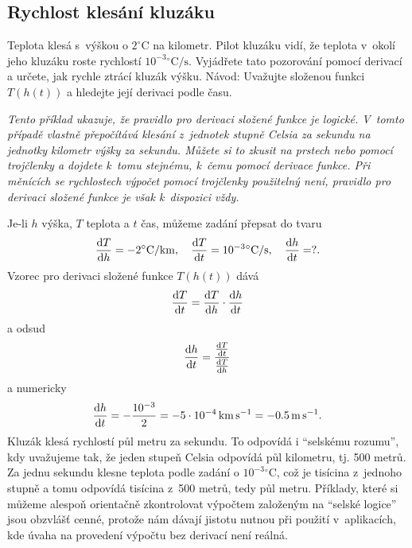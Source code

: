 \konec


\stranka


\subsection{Rychlost klesání kluzáku}
Teplota klesá s výškou o $2^\circ \mathrm C$ na kilometr. Pilot
kluzáku vidí, že teplota v okolí jeho kluzáku roste rychlostí
$10^{-3}{}^\circ \mathrm C/\mathrm{s}$. Vyjádřete tato pozorování pomocí
derivací a určete, jak rychle ztrácí kluzák výšku. Návod: Uvažujte složenou funkci $T(h(t))$ a hledejte její derivaci podle času.

\textit{Tento příklad ukazuje, že pravidlo pro derivaci složené funkce je logické. V tomto případě vlastně přepočítává klesání z jednotek stupně Celsia za sekundu na jednotky kilometr výšky za sekundu. Můžete si to zkusit na prstech nebo pomocí trojčlenky a dojdete k tomu stejnému, k čemu pomocí derivace funkce. Při měnících se rychlostech výpočet pomocí trojčlenky použitelný není, pravidlo pro derivaci složené funkce je však k dispozici vždy.}

\reseni
Je-li $h$ výška, $T$ teplota a $t$ čas, můžeme zadání přepsat do tvaru
\begin{equation*}
  \frac{\mathrm{d}T}{\mathrm{d}h}=-2^\circ\mathrm C/\mathrm{km}, \quad
  \frac{\mathrm{d}T}{\mathrm{d}t}= 10^{-3}{}^\circ\mathrm C/\mathrm{s}, \quad
  \frac{\mathrm{d}h}{\mathrm{d}t}=?.
\end{equation*}
Vzorec pro derivaci složené funkce $T(h(t))$ dává
\begin{equation*}
  \frac{\mathrm{d}T}{\mathrm{d}t} = \frac{\mathrm{d}T}{\mathrm{d}h} \cdot \frac{\mathrm{d}h}{\mathrm{d}t}
\end{equation*}
a odsud
\begin{equation*}
  \frac{\mathrm{d}h}{\mathrm{d}t} = \frac{\frac{\mathrm{d}T}{\mathrm{d}t}}{\frac{\mathrm{d}T}{\mathrm{d}h}}
\end{equation*}
a numericky
\begin{equation*}
  \frac{\mathrm{d}h}{\mathrm{d}t} = -\frac{10^{-3}}{2}=-5\cdot 10^{-4}\, \mathrm{km}\,\mathrm{s^{-1}}=-0.5 \,\mathrm{m}\,\mathrm{s}^{-1}.
\end{equation*}
Kluzák klesá rychlostí půl metru za sekundu. To odpovídá i ``selskému rozumu'', kdy uvažujeme tak, že jeden stupeň Celsia odpovídá půl kilometru, tj. 500 metrů. Za jednu sekundu klesne teplota podle zadání o $10^{-3}{}^\circ\mathrm{C}$, což je tisícina z jednoho stupně a tomu odpovídá tisícina z 500 metrů, tedy půl metru. Příklady, které si můžeme alespoň orientačně zkontrolovat výpočtem založeným na ``selské logice'' jsou obzvlášť cenné, protože nám dávají jistotu nutnou při použití v aplikacích, kde úvaha na provedení výpočtu bez derivací není reálná. 

